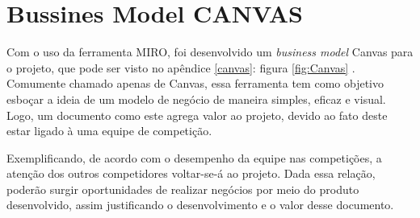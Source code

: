 \section{Bussines Model CANVAS}

Com o uso da ferramenta MIRO, foi desenvolvido um  \textit{business model} Canvas para o projeto, que pode ser visto no apêndice \ref{canvas}:  figura \ref{fig:Canvas} . Comumente chamado apenas de Canvas, essa ferramenta tem como objetivo esboçar a ideia de um modelo de negócio de maneira simples, eficaz e visual. Logo, um documento como este agrega valor ao projeto, devido ao fato deste estar ligado à uma equipe de competição.

Exemplificando, de acordo com o desempenho da equipe nas competições, a atenção dos outros competidores voltar-se-á ao projeto. Dada essa relação, poderão surgir  oportunidades de realizar negócios por meio do produto desenvolvido, assim justificando o desenvolvimento e o valor desse documento.  

